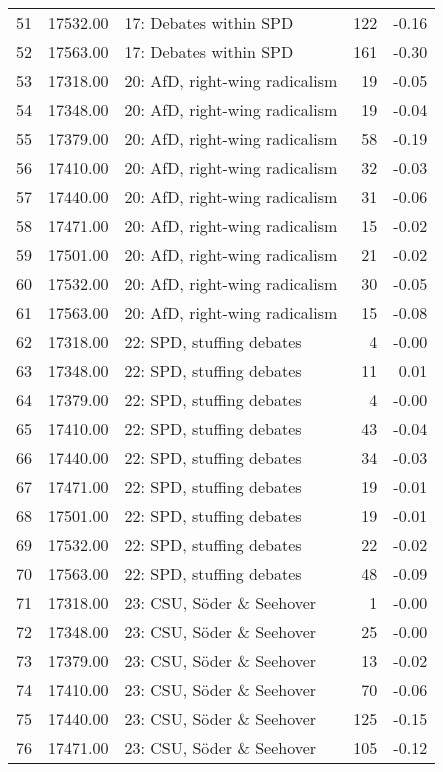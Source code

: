 \begin{table}[ht]
\begin{tabular}{rrlrr}
  51 & 17532.00 & 17: Debates within SPD & 122 & -0.16 \\ 
  52 & 17563.00 & 17: Debates within SPD & 161 & -0.30 \\ 
  53 & 17318.00 & 20: AfD, right-wing radicalism &  19 & -0.05 \\ 
  54 & 17348.00 & 20: AfD, right-wing radicalism &  19 & -0.04 \\ 
  55 & 17379.00 & 20: AfD, right-wing radicalism &  58 & -0.19 \\ 
  56 & 17410.00 & 20: AfD, right-wing radicalism &  32 & -0.03 \\ 
  57 & 17440.00 & 20: AfD, right-wing radicalism &  31 & -0.06 \\ 
  58 & 17471.00 & 20: AfD, right-wing radicalism &  15 & -0.02 \\ 
  59 & 17501.00 & 20: AfD, right-wing radicalism &  21 & -0.02 \\ 
  60 & 17532.00 & 20: AfD, right-wing radicalism &  30 & -0.05 \\ 
  61 & 17563.00 & 20: AfD, right-wing radicalism &  15 & -0.08 \\ 
  62 & 17318.00 & 22: SPD, stuffing debates &   4 & -0.00 \\ 
  63 & 17348.00 & 22: SPD, stuffing debates &  11 & 0.01 \\ 
  64 & 17379.00 & 22: SPD, stuffing debates &   4 & -0.00 \\ 
  65 & 17410.00 & 22: SPD, stuffing debates &  43 & -0.04 \\ 
  66 & 17440.00 & 22: SPD, stuffing debates &  34 & -0.03 \\ 
  67 & 17471.00 & 22: SPD, stuffing debates &  19 & -0.01 \\ 
  68 & 17501.00 & 22: SPD, stuffing debates &  19 & -0.01 \\ 
  69 & 17532.00 & 22: SPD, stuffing debates &  22 & -0.02 \\ 
  70 & 17563.00 & 22: SPD, stuffing debates &  48 & -0.09 \\ 
  71 & 17318.00 & 23: CSU, Söder \& Seehover &   1 & -0.00 \\ 
  72 & 17348.00 & 23: CSU, Söder \& Seehover &  25 & -0.00 \\ 
  73 & 17379.00 & 23: CSU, Söder \& Seehover &  13 & -0.02 \\ 
  74 & 17410.00 & 23: CSU, Söder \& Seehover &  70 & -0.06 \\ 
  75 & 17440.00 & 23: CSU, Söder \& Seehover & 125 & -0.15 \\ 
  76 & 17471.00 & 23: CSU, Söder \& Seehover & 105 & -0.12 \\ 

\end{tabular}
\end{table}
